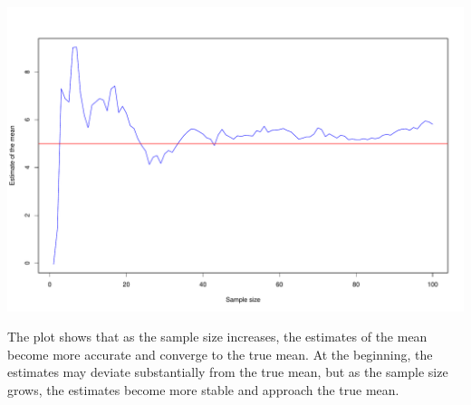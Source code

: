 \documentclass{article}
\begin{document}
\includegraphics{RMarkdown_files/figure-latex/global_options2-1.pdf}

The plot shows that as the sample size increases, the estimates of the
mean become more accurate and converge to the true mean. At the
beginning, the estimates may deviate substantially from the true mean,
but as the sample size grows, the estimates become more stable and
approach the true mean.

\newpage
\end{document}
